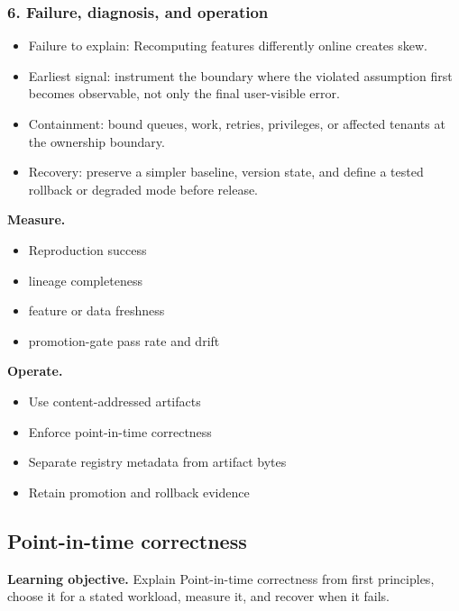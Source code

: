 \subsubsection*{6. Failure, diagnosis, and operation}
\begin{itemize}
\item Failure to explain: Recomputing features differently online creates skew.
\item Earliest signal: instrument the boundary where the violated assumption first becomes observable, not only the final user-visible error.
\item Containment: bound queues, work, retries, privileges, or affected tenants at the ownership boundary.
\item Recovery: preserve a simpler baseline, version state, and define a tested rollback or degraded mode before release.
\end{itemize}
\textbf{Measure.}\begin{itemize}
\item Reproduction success
\item lineage completeness
\item feature or data freshness
\item promotion-gate pass rate and drift
\end{itemize}
\textbf{Operate.}\begin{itemize}
\item Use content-addressed artifacts
\item Enforce point-in-time correctness
\item Separate registry metadata from artifact bytes
\item Retain promotion and rollback evidence
\end{itemize}
\subsection{Point-in-time correctness}
\textbf{Learning objective.} Explain Point-in-time correctness from first principles, choose it for a stated workload, measure it, and recover when it fails.
